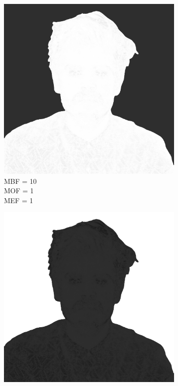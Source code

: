 \begin{figure}[htb]
\begin{subfigure}{0.32\textwidth}
        \includegraphics[width = \textwidth]{img/4-mine/taco-mask/taco_mask_c20_inv0_bg10_obj1_ed1.png}
        \caption{MBF = 10 \\ MOF = 1 \\ MEF = 1}
        \label{mine-param-taco-d}
    \end{subfigure}
    \begin{subfigure}{0.32\textwidth}
        \centering
        \includegraphics[width = \textwidth]{img/4-mine/taco-mask/taco_mask_c20_inv0_bg1_obj10_ed1.png}

\end{subfigure}
\end{figure}

